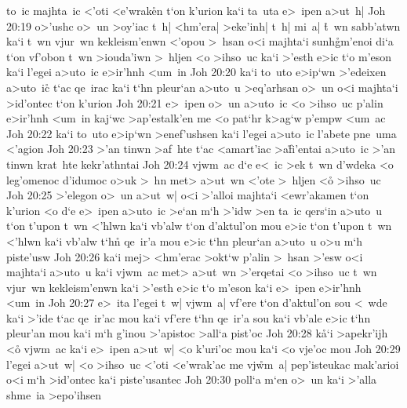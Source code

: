 to~ic
majhta~ic
<'oti
<e'wrak\r{e}n
t`on
k'urion
ka`i
ta~uta
e>~ipen
a>ut~h|\bibvsend
\vs Joh 20:19
o>'ushc
o>~un
>oy'iac
t~h|
<hm'era|
>eke'inh|
t~h|
mi~a|
\r{t}~wn
sabb'atwn
ka`i
t~wn
vjur~wn
kekleism'enwn
<'opou
>~hsan
o<i
majhta`i
sunh\r{g}m'enoi
di`a
t`on
vf'obon
t~wn
>iouda'iwn
>~hljen
<o
>ihso~uc
ka`i
>'esth
e>ic
t`o
m'eson
ka`i
l'egei
a>uto~ic
e>ir'hnh
<um~in\bibvsend
\vs Joh 20:20
ka`i
to~uto
e>ip`wn
>'edeixen
a>uto~ic\r{}
t`ac
qe~irac
ka`i
t`hn
pleur`an
a>uto~u
>eq'arhsan
o>~un
o<i
majhta`i
>id'ontec
t`on
k'urion\bibvsend
\vs Joh 20:21
e>~ipen
o>~un
a>uto~ic
<o
>ihso~uc
p'alin
e>ir'hnh
<um~in
kaj`wc
>ap'estalk'en
me
<o
pat`hr
k>ag`w
p'empw
<um~ac\bibvsend
\vs Joh 20:22
ka`i
to~uto
e>ip`wn
>enef'ushsen
ka`i
l'egei
a>uto~ic
l'abete
pne~uma
<'agion\bibvsend
\vs Joh 20:23
>'an
tinwn
>af~hte
t`ac
<amart'iac
>a\r{f}i'entai
a>uto~ic
>'an
tinwn
krat~hte
kekr'athntai\bibvsend
\vs Joh 20:24
vjwm~ac
d`e
e<~ic
>ek
t~wn
d'wdeka
<o
leg'omenoc
d'idumoc
o>uk
>~hn
met>
a>ut~wn
<'ote
>~hljen
<o\r{}
>ihso~uc\bibvsend
\vs Joh 20:25
>'elegon
o>~un
a>ut~w|
o<i
>'alloi
majhta`i
<ewr'akamen
t`on
k'urion
<o
d`e
e>~ipen
a>uto~ic
>e`an
m`h
>'idw
>en
ta~ic
qers`in
a>uto~u
t`on
t'upon
t~wn
<'hlwn
ka`i
vb'alw
t`on
d'aktul'on
mou
e>ic
t`on
t'upon
t~wn
<'hlwn
ka`i
vb'alw
t`hn\r{}
qe~ir'a
mou
e>ic
t`hn
pleur`an
a>uto~u
o>u
m`h
piste'usw\bibvsend
\vs Joh 20:26
ka`i
mej>
<hm'erac
>okt`w
p'alin
>~hsan
>'esw
o<i
majhta`i
a>uto~u
ka`i
vjwm~ac
met>
a>ut~wn
>'erqetai
<o
>ihso~uc
t~wn
vjur~wn
kekleism'enwn
ka`i
>'esth
e>ic
t`o
m'eson
ka`i
e>~ipen
e>ir'hnh
<um~in\bibvsend
\vs Joh 20:27
e>~ita
l'egei
t~w|
vjwm~a|
vf'ere
t`on
d'aktul'on
sou
<~wde
ka`i
>'ide
t`ac
qe~ir'ac
mou
ka`i
vf'ere
t`hn
qe~ir'a
sou
ka`i
vb'ale
e>ic
t`hn
pleur'an
mou
ka`i
m`h
g'inou
>'apistoc
>all`a
pist'oc\bibvsend
\vs Joh 20:28
k\r{a}`i
>apekr'ijh
<o\r{}
vjwm~ac
ka`i
e>~ipen
a>ut~w|
<o
k'uri'oc
mou
ka`i
<o
vje'oc
mou\bibvsend
\vs Joh 20:29
l'egei
a>ut~w|
<o
>ihso~uc
<'oti
<e'wrak'ac
me
vj\r{w}m~a|
pep'isteukac
mak'arioi
o<i
m`h
>id'ontec
ka`i
piste'usantec\bibvsend
\vs Joh 20:30
poll`a
m`en
o>~un
ka`i
>'alla
shme~ia
>epo'ihsen
